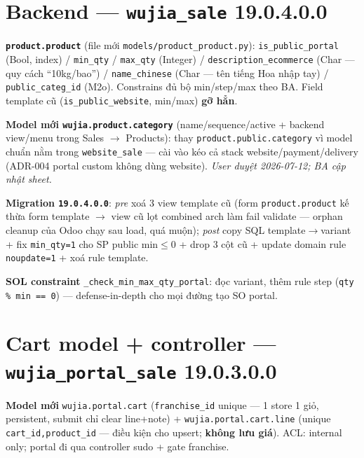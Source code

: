 \section{Backend --- \texttt{wujia\_sale} 19.0.4.0.0}

\textbf{\texttt{product.product}} (file mới \texttt{models/product\_product.py}):
\texttt{is\_public\_portal} (Bool, index) / \texttt{min\_qty} / \texttt{max\_qty} (Integer) /
\texttt{description\_ecommerce} (Char --- quy cách ``10kg/bao'') / \texttt{name\_chinese}
(Char --- tên tiếng Hoa nhập tay) / \texttt{public\_categ\_id} (M2o). Constrains đủ bộ
min/step/max theo BA. Field template cũ (\texttt{is\_public\_website}, min/max) \textbf{gỡ hẳn}.

\textbf{Model mới \texttt{wujia.product.category}} (name/sequence/active + backend view/menu
trong Sales $\rightarrow$ Products): thay \texttt{product.public.category} vì model chuẩn nằm trong
\texttt{website\_sale} --- cài vào kéo cả stack website/payment/delivery (ADR-004 portal
custom không dùng website). \emph{User duyệt 2026-07-12; BA cập nhật sheet.}

\textbf{Migration \texttt{19.0.4.0.0}}: \emph{pre} xoá 3 view template cũ (form
\texttt{product.product} kế thừa form template $\rightarrow$ view cũ lọt combined arch làm fail
validate --- orphan cleanup của Odoo chạy sau load, quá muộn); \emph{post} copy SQL
template$\rightarrow$variant + fix \texttt{min\_qty=1} cho SP public min$\leq$0 + drop 3 cột cũ +
update domain rule \texttt{noupdate=1} + xoá rule template.

\textbf{SOL constraint} \texttt{\_check\_min\_max\_qty\_portal}: đọc variant, thêm rule step
(\texttt{qty \% min == 0}) --- defense-in-depth cho mọi đường tạo SO portal.

\section{Cart model + controller --- \texttt{wujia\_portal\_sale} 19.0.3.0.0}

\textbf{Model mới} \texttt{wujia.portal.cart} (\texttt{franchise\_id} unique --- 1 store 1 giỏ,
persistent, submit chỉ clear line+note) + \texttt{wujia.portal.cart.line}
(unique \texttt{cart\_id,product\_id} --- điều kiện cho upsert; \textbf{không lưu giá}).
ACL: internal only; portal đi qua controller sudo + gate franchise.

